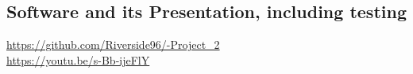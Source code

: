 \documentclass[a4paper]{article}
\begin{document}





%             
%             




\pagebreak




\pagebreak
\subsection{Software and its Presentation, including testing}
\url{https://github.com/Riverside96/-Project_2} \\
\url{https://youtu.be/s-Bb-ijeFlY}
\end{document}
